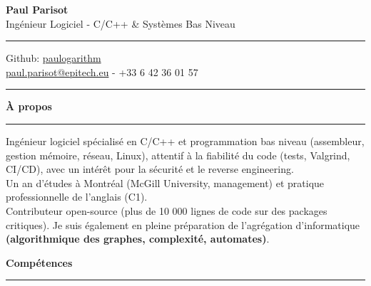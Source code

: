\documentclass[9pt]{extarticle}
\begin{document}
\begin{center}
	{\huge\bfseries Paul Parisot}
	\\[4pt]
	{\Large Ingénieur Logiciel - C/C++ \& Systèmes Bas Niveau}
	\\
\end{center}

\par\vspace{-5pt}
\rule{\linewidth}{0.4pt}
\par\vspace{-5pt}

\begin{center}
	Github: \href{https://github.com/paulogarithm}{paulogarithm}
	\\
	\href{mailto:paul.parisot@epitech.eu}{paul.parisot@epitech.eu} - +33 6 42 36 01 57
	\\
\end{center}

\par\vspace{-10pt}
\rule{\linewidth}{0.4pt}
\par\vspace{7pt}

{\large\bfseries À propos}
\par\vspace{-8pt}
\rule{\linewidth}{0.4pt}
\par\vspace{5pt}

Ingénieur logiciel spécialisé en C/C++ et programmation bas niveau (assembleur, gestion mémoire, réseau, Linux), attentif à la fiabilité du code (tests, Valgrind, CI/CD), avec un intérêt pour la sécurité et le reverse engineering.
\\
Un an d'études à Montréal (McGill University, management) et pratique professionnelle de l'anglais (C1).
\\
Contributeur open-source (plus de 10 000 lignes de code sur des packages critiques). Je suis également en pleine préparation de l'agrégation d'informatique {\bfseries (algorithmique des graphes, complexité, automates)}.
\par\vspace{5pt}

{\large\bfseries Compétences}
\par\vspace{-8pt}
\rule{\linewidth}{0.4pt}
\par\vspace{5pt}
\end{document}
